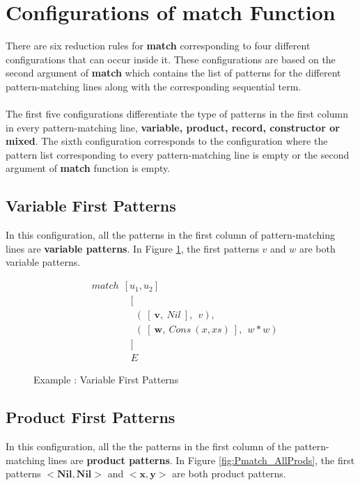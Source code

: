 \documentclass[11pt]{article}
\begin{document}
\section{Configurations of match Function}\label{Pmatch:RedConfigs} 
There are six reduction rules for {\bf match} corresponding to four different configurations that can occur inside it. These configurations are based on the second argument of {\bf match} which contains the list of patterns for the different pattern-matching lines along with the corresponding sequential term.
~~\\~~\\
The first five configurations differentiate the type of patterns in the first column in every pattern-matching line, {\bf variable, product, record, constructor or mixed}. The sixth configuration corresponds to the configuration where the pattern list corresponding to every pattern-matching line is empty or the second argument of {\bf match} function is empty.
\subsection{Variable First Patterns}
In this configuration, all the patterns in the first column of pattern-matching lines are {\bf variable patterns}. In Figure \ref {fig:Pmatch_AllVars}, the first patterns $v$ and $w$ are both variable patterns.
    \begin{figure}[!h]
    \begin{align*} 
    &match~~[u_1,u_2] \\
    &\qquad\qquad [\\
    &\qquad\qquad ~~(~[~\mathbf{v},~Nil~],~~v), \\
    &\qquad\qquad ~~(~[~\mathbf{w},~Cons~(x,xs)~],~~w*w) \\
    &\qquad\qquad ]\\
    &\qquad\qquad E
    \end{align*} 
    \caption{Example : Variable First Patterns} \label{fig:Pmatch_AllVars}
    \end{figure}

\subsection {Product First Patterns}
In this configuration, all the the patterns in the first column of the pattern-matching lines are {\bf product patterns}. In Figure \ref {fig:Pmatch_AllProds}, the first patterns $\mathbf{<Nil,Nil>}$ and $\mathbf{<x,y>}$ are both product patterns.
\end{document}
